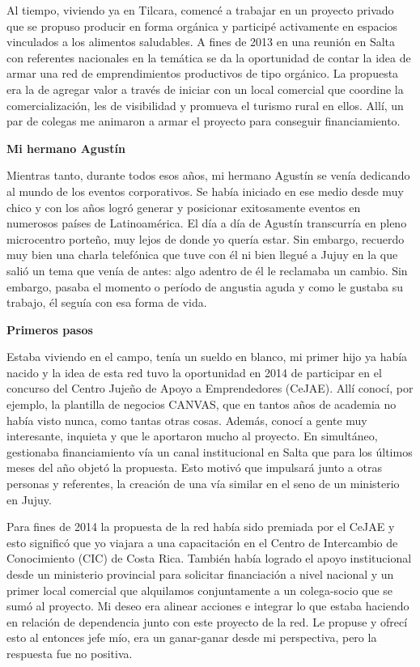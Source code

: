 Al tiempo, viviendo ya en Tilcara, comencé a trabajar en un proyecto
privado que se propuso producir en forma orgánica y participé
activamente en espacios vinculados a los alimentos saludables. A fines
de 2013 en una reunión en Salta con referentes nacionales en la temática
se da la oportunidad de contar la idea de armar una red de
emprendimientos productivos de tipo orgánico. La propuesta era la de
agregar valor a través de iniciar con un local comercial que coordine la
comercialización, les de visibilidad y promueva el turismo rural en
ellos. Allí, un par de colegas me animaron a armar el proyecto para
conseguir financiamiento.

\textbf{Mi hermano Agustín}

Mientras tanto, durante todos esos años, mi hermano Agustín se venía
dedicando al mundo de los eventos corporativos. Se había iniciado en ese
medio desde muy chico y con los años logró generar y posicionar
exitosamente eventos en numerosos países de Latinoamérica. El día a día
de Agustín transcurría en pleno microcentro porteño, muy lejos de donde
yo quería estar. Sin embargo, recuerdo muy bien una charla telefónica
que tuve con él ni bien llegué a Jujuy en la que salió un tema que venía
de antes: algo adentro de él le reclamaba un cambio. Sin embargo, pasaba
el momento o período de angustia aguda y como le gustaba su trabajo, él
seguía con esa forma de vida.

\textbf{Primeros pasos}

Estaba viviendo en el campo, tenía un sueldo en blanco, mi primer hijo
ya había nacido y la idea de esta red tuvo la oportunidad en 2014 de
participar en el concurso del Centro Jujeño de Apoyo a Emprendedores
(CeJAE). Allí conocí, por ejemplo, la plantilla de negocios CANVAS, que
en tantos años de academia no había visto nunca, como tantas otras
cosas. Además, conocí a gente muy interesante, inquieta y que le
aportaron mucho al proyecto. En simultáneo, gestionaba financiamiento
vía un canal institucional en Salta que para los últimos meses del año
objetó la propuesta. Esto motivó que impulsará junto a otras personas y
referentes, la creación de una vía similar en el seno de un ministerio
en Jujuy.

Para fines de 2014 la propuesta de la red había sido premiada por el
CeJAE y esto significó que yo viajara a una capacitación en el Centro de
Intercambio de Conocimiento (CIC) de Costa Rica. También había logrado
el apoyo institucional desde un ministerio provincial para solicitar
financiación a nivel nacional y un primer local comercial que alquilamos
conjuntamente a un colega-socio que se sumó al proyecto. Mi deseo era
alinear acciones e integrar lo que estaba haciendo en relación de
dependencia junto con este proyecto de la red. Le propuse y ofrecí esto
al entonces jefe mío, era un ganar-ganar desde mi perspectiva, pero la
respuesta fue no positiva.

